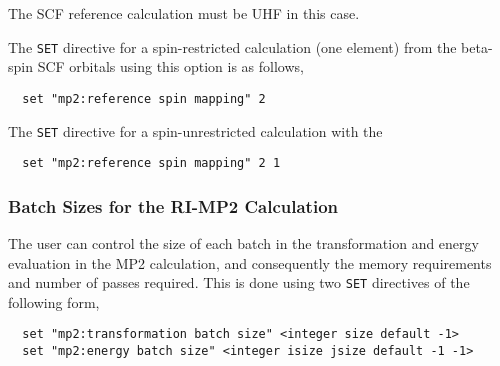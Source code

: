 The SCF reference calculation must be UHF in this case.
 


The \verb+SET+ directive for a spin-restricted calculation (one element)
from the beta-spin SCF orbitals using this option is as follows,
\begin{verbatim}
  set "mp2:reference spin mapping" 2
\end{verbatim}



The \verb+SET+ directive for a spin-unrestricted calculation with the
\begin{verbatim}
  set "mp2:reference spin mapping" 2 1
\end{verbatim}


\subsubsection{Batch Sizes for the RI-MP2 Calculation}

The user can control the size of each batch in the transformation and
energy evaluation in the MP2 calculation, and consequently the memory
requirements and number of passes required.  This is done using two
\verb+SET+ directives of the following form,

\begin{verbatim}
  set "mp2:transformation batch size" <integer size default -1>
  set "mp2:energy batch size" <integer isize jsize default -1 -1>
\end{verbatim}


